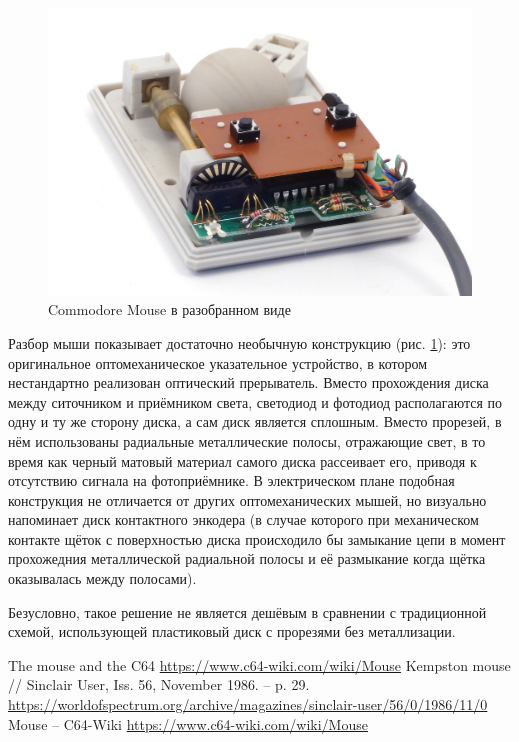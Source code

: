 \documentclass[11pt, a4paper]{article}
\begin{document}
\begin{figure}[h]
    \centering
    \includegraphics[scale=0.7]{1986_commodore_c300_mouse/cm4raz_30.jpg}
    \caption{Commodore Mouse в разобранном виде}
    \label{fig:C300Inside}
\end{figure}

Разбор мыши показывает достаточно необычную конструкцию (рис. \ref{fig:C300Inside}): это оригинальное оптомеханическое указательное устройство, в котором нестандартно реализован оптический прерыватель. Вместо прохождения диска между ситочником и приёмником света, светодиод и фотодиод располагаются по одну и ту же сторону диска, а сам диск является сплошным. Вместо прорезей, в нём использованы радиальные металлические полосы, отражающие свет, в то время как черный матовый материал самого диска рассеивает его, приводя к отсутствию сигнала на фотоприёмнике. В электрическом плане подобная конструкция не отличается от других оптомеханических мышей, но визуально напоминает диск контактного энкодера (в случае которого при механическом контакте щёток с поверхностью диска происходило бы замыкание цепи в момент прохожедния металлической радиальной полосы и её размыкание когда щётка оказывалась между полосами).

Безусловно, такое решение не является дешёвым в сравнении с традиционной схемой, использующей пластиковый диск с прорезями без металлизации.

\begin{thebibliography}{9}
 The mouse and the C64 \url{https://www.c64-wiki.com/wiki/Mouse}
 Kempston mouse // Sinclair User, Iss. 56, November 1986. -- p. 29. \url{https://worldofspectrum.org/archive/magazines/sinclair-user/56/0/1986/11/0}
 Mouse -- C64-Wiki \url{https://www.c64-wiki.com/wiki/Mouse}
\end{thebibliography}
\end{document}
